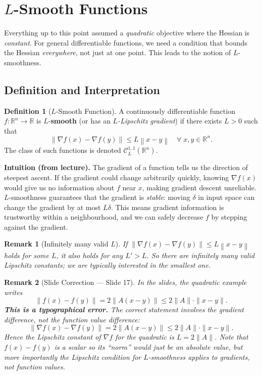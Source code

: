 \documentclass[11pt]{article}
\theoremstyle{definition}
\newtheorem{definition}{Definition}
\theoremstyle{plain}
\newtheorem{remark}{Remark}
\newcommand{\R}{\mathbb{R}}
\newcommand{\norm}[1]{\left\|#1\right\|}
\newcommand{\grad}{\nabla}
\begin{document}
\section{$L$-Smooth Functions}

Everything up to this point assumed a \emph{quadratic} objective where the
Hessian is \emph{constant}. For general differentiable functions, we need
a condition that bounds the Hessian \emph{everywhere}, not just at one point.
This leads to the notion of $L$-smoothness.

\subsection{Definition and Interpretation}

\begin{definition}[$L$-Smooth Function]\label{def:L_smooth}
A continuously differentiable function $f:\R^n\to\R$ is $L$-\textbf{smooth}
(or has an \emph{$L$-Lipschitz gradient}) if there exists $L>0$ such that
\[
  \norm{\grad f(x) - \grad f(y)} \leq L\norm{x-y}
  \quad\forall\; x,y\in\R^n.
\]
The class of such functions is denoted $\mathcal{C}^{1,1}_L(\R^n)$.
\end{definition}

\noindent\textbf{Intuition (from lecture).}
The gradient of a function tells us the direction of steepest ascent.
If the gradient could change arbitrarily quickly, knowing $\grad f(x)$
would give us no information about $f$ near $x$, making gradient descent
unreliable. $L$-smoothness guarantees that the gradient is \emph{stable}:
moving $\delta$ in input space can change the gradient by at most $L\delta$.
This means gradient information is trustworthy within a neighbourhood,
and we can safely decrease $f$ by stepping against the gradient.

\begin{remark}[Infinitely many valid $L$]
If $\norm{\grad f(x)-\grad f(y)}\leq L\norm{x-y}$ holds for some $L$,
it also holds for any $L'>L$. So there are infinitely many valid Lipschitz
constants; we are typically interested in the \emph{smallest} one.
\end{remark}

\begin{remark}[Slide Correction --- Slide 17]\label{rem:slide_correction}
In the slides, the quadratic example writes
\[
  \|f(x)-f(y)\| = 2\|A(x-y)\| \leq 2\|A\|\cdot\|x-y\|.
\]
\textbf{This is a typographical error.} The correct statement involves
the \emph{gradient} difference, not the function value difference:
\[
  \|\grad f(x)-\grad f(y)\| = 2\|A(x-y)\| \leq 2\|A\|\cdot\|x-y\|.
\]
Hence the Lipschitz constant of $\grad f$ for the quadratic is $L=2\|A\|$.
Note that $f(x)-f(y)$ is a scalar so its ``norm'' would just be an absolute value,
but more importantly the Lipschitz condition for $L$-smoothness applies to
\emph{gradients}, not function values.
\end{remark}
\end{document}
